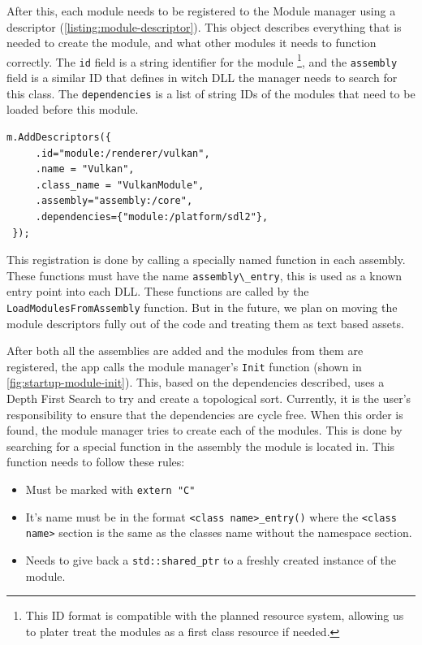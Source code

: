 After this, each module needs to be registered to the Module manager using a descriptor (\autoref{listing:module-descriptor}). This object describes everything that is needed to create the module, and what other modules it needs to function correctly. The \verb|id| field is a string identifier for the module \footnote{This ID format is compatible with the planned resource system, allowing us to plater treat the modules as a first class resource if needed.}, and the \verb|assembly| field is a similar ID that defines in witch DLL the manager needs to search for this class. The \verb|dependencies| is a list of string IDs of the modules that need to be loaded before this module.

\begin{listing}[!ht]
    \begin{verbatim}
m.AddDescriptors({
	 .id="module:/renderer/vulkan",
	 .name = "Vulkan",
	 .class_name = "VulkanModule",
	 .assembly="assembly:/core",
	 .dependencies={"module:/platform/sdl2"},
 });
    \end{verbatim}
    \caption{Example of a module descriptor}
    \label{listing:module-descriptor}
\end{listing}

This registration is done by calling a specially named function in each assembly. These functions must have the name \verb|assembly\_entry|, this is used as a known entry point into each DLL. These functions are called by the \verb|LoadModulesFromAssembly| function. But in the future, we plan on moving the module descriptors fully out of the code and treating them as text based assets.

After both all the assemblies are added and the modules from them are registered, the app calls the module manager's \verb|Init| function (shown in \autoref{fig:startup-module-init}). This, based on the dependencies described, uses a Depth First Search to try and create a topological sort. Currently, it is the user's responsibility to ensure that the dependencies are cycle free. When this order is found, the module manager tries to create each of the modules. This is done by searching for a special function in the assembly the module is located in. This function needs to follow these rules:
\begin{itemize}
    \item Must be marked with \verb|extern "C"|
    \item It's name must be in the format \verb|<class name>_entry()| where the \verb|<class name>| section is the same as the classes name without the namespace section.
    \item Needs to give back a \verb|std::shared_ptr| to a freshly created instance of the module.
\end{itemize}

